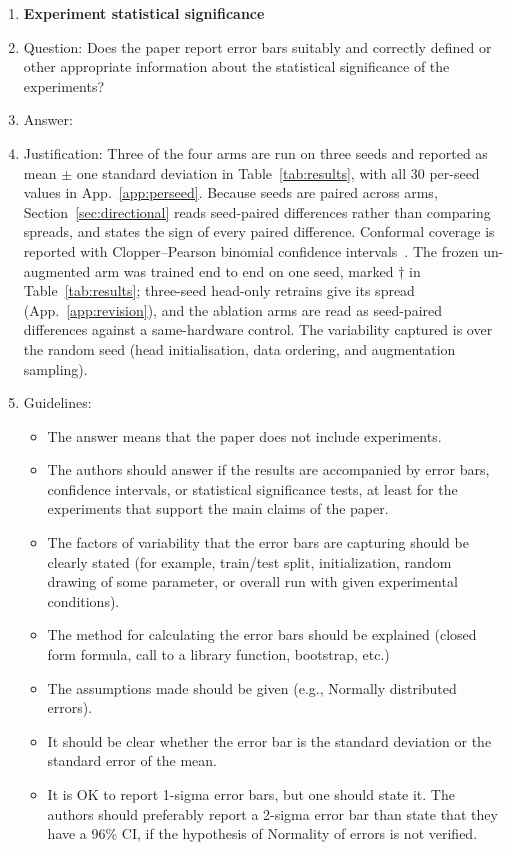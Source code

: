 \begin{enumerate}
\item {\bf Experiment statistical significance}
    \item[] Question: Does the paper report error bars suitably and correctly defined or other appropriate information about the statistical significance of the experiments?
    \item[] Answer: \answerYes{}
    \item[] Justification: Three of the four arms are run on three seeds and reported as mean $\pm$ one standard
    deviation in Table~\ref{tab:results}, with all 30 per-seed values
    in App.~\ref{app:perseed}. Because seeds are paired across arms,
    Section~\ref{sec:directional} reads seed-paired differences rather than comparing spreads,
    and states the sign of every paired difference. Conformal coverage is reported with
    Clopper--Pearson binomial confidence intervals~\citep{clopper1934use}. The frozen un-augmented arm was
    trained end to end on one seed, marked $\dagger$ in Table~\ref{tab:results}; three-seed
    head-only retrains give its spread (App.~\ref{app:revision}), and the ablation arms are
    read as seed-paired differences against a same-hardware control.
    The variability captured is over the random seed (head initialisation, data ordering, and
    augmentation sampling).
    \item[] Guidelines:
    \begin{itemize}
        \item The answer \answerNA{} means that the paper does not include experiments.
        \item The authors should answer \answerYes{} if the results are accompanied by error bars, confidence intervals, or statistical significance tests, at least for the experiments that support the main claims of the paper.
        \item The factors of variability that the error bars are capturing should be clearly stated (for example, train/test split, initialization, random drawing of some parameter, or overall run with given experimental conditions).
        \item The method for calculating the error bars should be explained (closed form formula, call to a library function, bootstrap, etc.)
        \item The assumptions made should be given (e.g., Normally distributed errors).
        \item It should be clear whether the error bar is the standard deviation or the standard error of the mean.
        \item It is OK to report 1-sigma error bars, but one should state it. The authors should preferably report a 2-sigma error bar than state that they have a 96\% CI, if the hypothesis of Normality of errors is not verified.

\end{itemize}
\end{enumerate}
